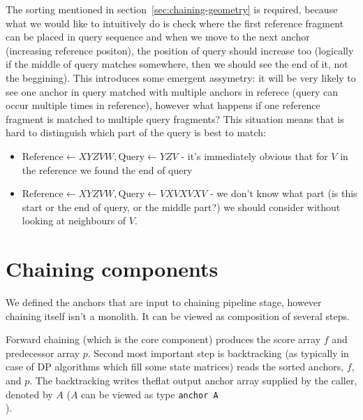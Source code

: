 The sorting mentioned in section~\ref{sec:chaining-geometry} is required, because what we would like to intuitively do is check where the first reference fragment can be placed in query sequence and when we move to the next anchor (increasing reference positon), the position of query should increase too (logically if the middle of query matches somewhere, then we should see the end of it, not the beggining).
This introduces some emergent assymetry: it will be very likely to see one anchor in query matched with multiple anchors in referece (query can occur multiple times in reference), however what happens if one reference fragment is matched to multiple query fragments?
This situation means that is hard to distinguish which part of the query is best to match:
\begin{itemize}
  \item $\text{Reference}\gets XYZVW, \text{Query}\gets YZV$ - it's immediately obvious that for $V$ in the reference we found the end of query
  \item $\text{Reference}\gets XYZVW, \text{Query}\gets VXVXVXV$ - we don't know what part (is this start or the end of query, or the middle part?) we should consider without looking at neighbours of $V$.
\end{itemize}


\section{Chaining components}

We defined the anchors that are input to chaining pipeline stage, however chaining itself isn't a monolith. It can be viewed as composition of several steps. 


Forward chaining (which is the core component) produces the score array \(f\) and predecessor array \(p\). Second most important step is backtracking (as typically in case of DP algorithms which fill some state matrices) reads the sorted anchors, \(f\), and \(p\). The backtracking writes theflat output
anchor array supplied by the caller, denoted by \(A\) ($A$ can be viewed as type \texttt{anchor A\[\]}).

